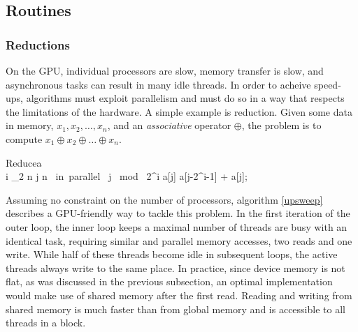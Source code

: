 \subsection{Routines}
\subsubsection{Reductions}
\label{subsec:reduce}
On the GPU, individual processors are slow, memory transfer is slow, and asynchronous tasks can result in many idle threads. In order to acheive speed-ups, algorithms must exploit parallelism and must do so in a way that respects the limitations of the hardware. A simple example is reduction. Given some data in memory, $x_1, x_2, \ldots, x_n$, and an \textit{associative} operator $\oplus$, the problem is to compute $x_1 \oplus x_2 \oplus \ldots \oplus x_n$. 

\begin{pseudocode}[ruled]{Reduce}{a}
\label{upsweep}
\\
\FOR i  \TO \log_2 n \DO \BEGIN
  \FOR j  \TO n \mbox{ in parallel }\DO \BEGIN
    \IF j \mbox{ mod } 2^i \DO \BEGIN
    a[j] \GETS a[j-2^{i-1}] + a[j];\\
    \END \END \END
{}
\end{pseudocode}

Assuming no constraint on the number of processors, algorithm \ref{upsweep} describes a GPU-friendly way to tackle this problem. In the first iteration of the outer loop, the inner loop keeps a maximal number of threads are busy with an identical task, requiring similar and parallel memory accesses, two reads and one write. While half of these threads become idle in subsequent loops, the active threads always write to the same place. In practice, since device memory is not flat, as was discussed in the previous subsection, an optimal implementation would make use of shared memory after the first read. Reading and writing from shared memory is much faster than from global memory and is accessible to all threads in a block.



